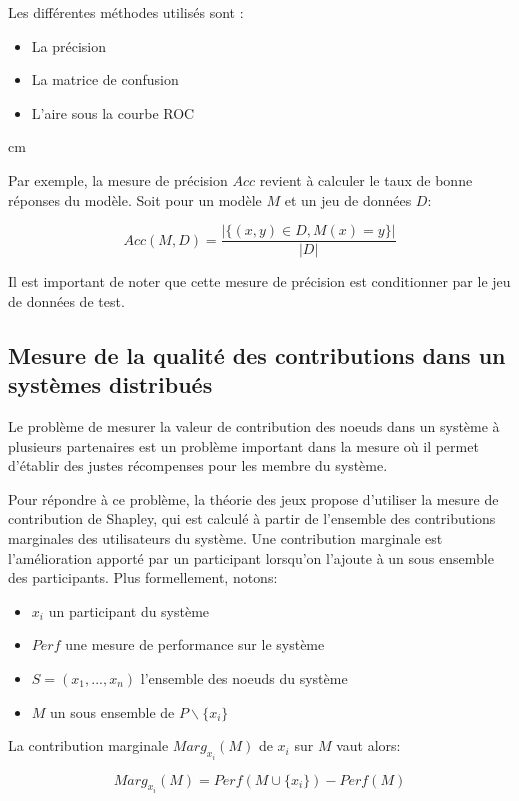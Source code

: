 \documentclass[stage3a]{tnreport} %
\begin{document}
Les différentes méthodes utilisés sont :
\begin{itemize}
  \item La précision 
  \item La matrice de confusion 
  \item L'aire sous la courbe ROC 
\end{itemize}

 cm

Par exemple, la mesure de précision $Acc$ revient à calculer le taux de bonne réponses du modèle. Soit pour un modèle $M$ et un jeu de données $D$:

\begin{equation}
  Acc(M,D)= \frac{|\{ (x,y)\in D , M(x) = y \}|}{|D|}
\end{equation}

Il est important de noter que cette mesure de précision est conditionner par le jeu de données de test.

\subsection{Mesure de la qualité des contributions dans un systèmes distribués}

Le problème de mesurer la valeur de contribution des noeuds dans un système à plusieurs partenaires est un problème important dans la mesure où il permet d'établir des justes récompenses pour les membre du système.

Pour répondre à ce problème, la théorie des jeux propose d'utiliser la mesure de contribution de Shapley, qui est calculé à partir de l'ensemble des contributions marginales des utilisateurs du système. Une contribution marginale est l'amélioration apporté par un participant lorsqu'on l'ajoute à un sous ensemble des participants. Plus formellement, notons:

\begin{itemize}
  \item $x_i$ un participant du système 
  \item $Perf$ une mesure de performance sur le système
  \item $S = (x_1,...,x_n)$ l'ensemble des noeuds du système
  \item $M$ un sous ensemble de $P \backslash \{x_i\}$
\end{itemize}

La contribution marginale $Marg_{x_i}(M)$ de $x_i$ sur $M$ vaut alors:

\begin{equation}
  Marg_{x_i}(M) = Perf(M \cup \{x_i\}) - Perf(M)
\end{equation}
\end{document}
